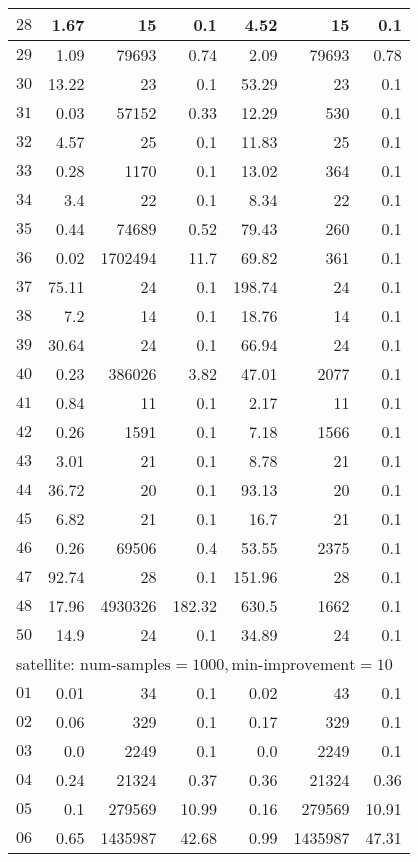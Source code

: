 \begin{longtable}{|c||r|r|r||r|r|r|}
$28$ & 1.67 & 15 & 0.1 &4.52 & 15 & 0.1 \\\hline
$29$ & 1.09 & 79693 & 0.74 &2.09 & 79693 & 0.78 \\\hline
$30$ & 13.22 & 23 & 0.1 &53.29 & 23 & 0.1 \\\hline
$31$ & 0.03 & 57152 & 0.33 &12.29 & 530 & 0.1 \\\hline
$32$ & 4.57 & 25 & 0.1 &11.83 & 25 & 0.1 \\\hline
$33$ & 0.28 & 1170 & 0.1 &13.02 & 364 & 0.1 \\\hline
$34$ & 3.4 & 22 & 0.1 &8.34 & 22 & 0.1 \\\hline
$35$ & 0.44 & 74689 & 0.52 &79.43 & 260 & 0.1 \\\hline
$36$ & 0.02 & 1702494 & 11.7 &69.82 & 361 & 0.1 \\\hline
$37$ & 75.11 & 24 & 0.1 &198.74 & 24 & 0.1 \\\hline
$38$ & 7.2 & 14 & 0.1 &18.76 & 14 & 0.1 \\\hline
$39$ & 30.64 & 24 & 0.1 &66.94 & 24 & 0.1 \\\hline
$40$ & 0.23 & 386026 & 3.82 &47.01 & 2077 & 0.1 \\\hline
$41$ & 0.84 & 11 & 0.1 &2.17 & 11 & 0.1 \\\hline
$42$ & 0.26 & 1591 & 0.1 &7.18 & 1566 & 0.1 \\\hline
$43$ & 3.01 & 21 & 0.1 &8.78 & 21 & 0.1 \\\hline
$44$ & 36.72 & 20 & 0.1 &93.13 & 20 & 0.1 \\\hline
$45$ & 6.82 & 21 & 0.1 &16.7 & 21 & 0.1 \\\hline
$46$ & 0.26 & 69506 & 0.4 &53.55 & 2375 & 0.1 \\\hline
$47$ & 92.74 & 28 & 0.1 &151.96 & 28 & 0.1 \\\hline
$48$ & 17.96 & 4930326 & 182.32 &630.5 & 1662 & 0.1 \\\hline
$50$ & 14.9 & 24 & 0.1 &34.89 & 24 & 0.1 \\\hline


\multicolumn{7}{|l|}{satellite: $\text{num-samples}=1000,\text{min-improvement}=10$}\\\hline
$01$ & 0.01 & 34 & 0.1 &0.02 & 43 & 0.1 \\\hline
$02$ & 0.06 & 329 & 0.1 &0.17 & 329 & 0.1 \\\hline
$03$ & 0.0 & 2249 & 0.1 &0.0 & 2249 & 0.1 \\\hline
$04$ & 0.24 & 21324 & 0.37 &0.36 & 21324 & 0.36 \\\hline
$05$ & 0.1 & 279569 & 10.99 &0.16 & 279569 & 10.91 \\\hline
$06$ & 0.65 & 1435987 & 42.68 &0.99 & 1435987 & 47.31 \\\hline


\end{longtable}
